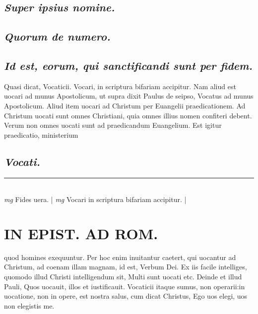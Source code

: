 \documentclass{article}
\begin{document}
\begin{pages}
\subsection*{\textit{Super ipsius nomine. }}
{}
\subsection*{\textit{Quorum de numero. }}
{}
\subsection*{\textit{Id est, eorum, qui sanctificandi sunt per fidem.  }}\pstart Quasi dicat, Vocaticii. Vocari, in scriptura bifariam accipitur. Nam aliud est uocari ad munus Apostolicum, ut supra dixit Paulus de seipso, Vocatus ad munus Apostolicum. Aliud item uocari ad Christum per Euangelii praedicationem. Ad Christum uocati sunt omnes Christiani, quia omnes illius nomen confiteri debent. Verum non omnes uocati sunt ad praedicandum Euangelium. Est igitur praedicatio, ministerium  \pend
{}
{}
\subsection*{\textit{Vocati. }}
\vspace{0.5cm}\noindent
\vspace{0.2cm}\rule{1cm}{0.2pt}\\ 
\hspace{0.2cm}\textit{mg}
\footnotesize Fides uera.  
\normalsize| 
\hspace{0.2cm}\textit{mg}
\footnotesize Vocari in scriptura bifariam accipitur.  
\normalsize| 
\section*{IN EPIST. AD ROM.  }
\marginpar{[ p.4 ]}\pstart quod homines exequuntur. Per hoc enim inuitantur caetert, qui uocantur ad Christum, ad coenam illam magnam, id est, Verbum Dei. Ex iis facile intelliges, quomodo illud Christi intelligendum sit, Multi sunt uocati etc. Deinde et illud Pauli, Quos uocauit, illos et iustificauit. Vocaticii itaque sumus, non operarii:in uocatione, non in opere, est nostra salus, cum dicat Christus, Ego uos elegi, uos non elegistis me.   \pend
{}
{}

\end{pages}
\end{document}

